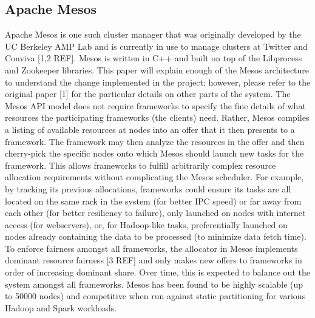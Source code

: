 \subsection{Apache Mesos}
Apache Mesos is one such cluster manager that was originally developed by the UC Berkeley AMP Lab and is currently in use to manage clusters at Twitter and Conviva [1,2 REF]. Mesos is written in C++ and built on top of the Libprocess and Zookeeper libraries. This paper will explain enough of the Mesos architecture to understand the change implemented in the project; however, please refer to the original paper [1] for the particular details on other parts of the system. The Mesos API model does not require frameworks to specify the fine details of what resources the participating frameworks (the clients) need. Rather, Mesos compiles a listing of available resources at nodes into an offer that it then presents to a framework. The framework may then analyze the resources in the offer and then cherry-pick the specific nodes onto which Mesos should launch new tasks for the framework. This allows frameworks to fulfill arbitrarily complex resource allocation requirements without complicating the Mesos scheduler. For example, by tracking its previous allocations, frameworks could ensure its tasks are all located on the same rack in the system (for better IPC speed) or far away from each other (for better resiliency to failure), only launched on nodes with internet access (for webservers), or, for Hadoop-like tasks, preferentially launched on nodes already containing the data to be processed (to minimize data fetch time). To enforce fairness amongst all frameworks, the allocator in Mesos implements dominant resource fairness [3 REF] and only makes new offers to frameworks in order of increasing dominant share. Over time, this is expected to balance out the system amongst all frameworks. Mesos has been found to be highly scalable (up to 50000 nodes) and competitive when run against static partitioning for various Hadoop and Spark workloads.

